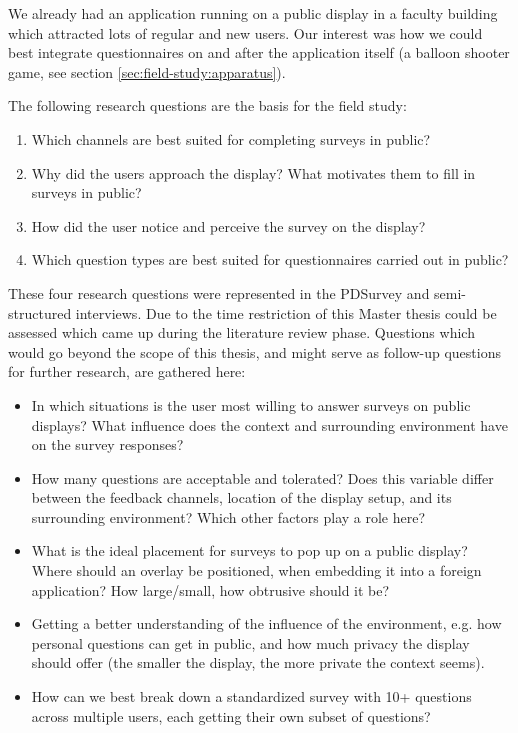 	We already had an application running on a public display in a faculty building which attracted lots of regular and new users. Our interest was how we could best integrate questionnaires on and after the application itself (a balloon shooter game, see section \ref{sec:field-study:apparatus}).

	The following research questions are the basis for the field study:

	\begin{enumerate}
		\item Which channels are best suited for completing surveys in public?
		\item Why did the users approach the display? What motivates them to fill in surveys in public? 
		\item How did the user notice and perceive the survey on the display?
		\item Which question types are best suited for questionnaires carried out in public? 
	\end{enumerate}

		These four research questions were represented in the PDSurvey and semi-structured interviews. Due to the time restriction of this Master thesis could be assessed which came up during the literature review phase. Questions which would go beyond the scope of this thesis, and might serve as follow-up questions for further research, are gathered here:

		\begin{itemize}
		\item In which situations is the user most willing to answer surveys on public displays? What influence does the context and surrounding environment have on the survey responses?
		\item How many questions are acceptable and tolerated? Does this variable differ between the feedback channels, location of the display setup, and its surrounding environment? Which other factors play a role here?
		\item What is the ideal placement for surveys to pop up on a public display? Where should an overlay be positioned, when embedding it into a foreign application? How large/small, how obtrusive should it be?
		\item Getting a better understanding of the influence of the environment, e.g. how personal questions can get in public, and how much privacy the display should offer (the smaller the display, the more private the context seems).
		\item How can we best break down a standardized survey with 10+ questions across multiple users, each getting their own subset of questions?
		\end{itemize}

